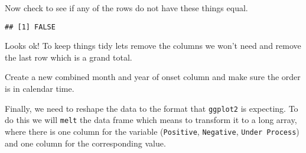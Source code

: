 \documentclass[]{article}
\newenvironment{Shaded}{\begin{snugshade}}{\end{snugshade}}
\newcommand{\CommentTok}[1]{\textcolor[rgb]{0.56,0.35,0.01}{\textit{#1}}}
\newcommand{\DataTypeTok}[1]{\textcolor[rgb]{0.13,0.29,0.53}{#1}}
\newcommand{\KeywordTok}[1]{\textcolor[rgb]{0.13,0.29,0.53}{\textbf{#1}}}
\newcommand{\NormalTok}[1]{#1}
\newcommand{\OperatorTok}[1]{\textcolor[rgb]{0.81,0.36,0.00}{\textbf{#1}}}
\newcommand{\OtherTok}[1]{\textcolor[rgb]{0.56,0.35,0.01}{#1}}
\newcommand{\StringTok}[1]{\textcolor[rgb]{0.31,0.60,0.02}{#1}}
\begin{document}
Now check to see if any of the rows do not have these things equal.

\begin{Shaded}
\end{Shaded}

\begin{verbatim}
## [1] FALSE
\end{verbatim}

Looks ok! To keep things tidy lets remove the columns we won't need and
remove the last row which is a grand total.

\begin{Shaded}
\end{Shaded}

Create a new combined month and year of onset column and make sure the
order is in calendar time.

\begin{Shaded}
\end{Shaded}

Finally, we need to reshape the data to the format that \texttt{ggplot2}
is expecting. To do this we will \texttt{melt} the data frame which
means to transform it to a long array, where there is one column for the
variable (\texttt{Positive}, \texttt{Negative}, \texttt{Under\ Process})
and one column for the corresponding value.
\end{document}
